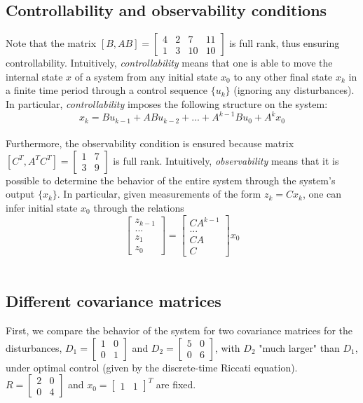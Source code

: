 \documentclass[11pt, oneside]{article}   	%
\begin{document}
\subsection{Controllability and observability conditions}
Note that the matrix $[B, AB] = \begin{bmatrix} 4 & 2 & 7 & 11 \\[0.3em] 1 & 3 & 10 & 10 \end{bmatrix}$ is full rank, thus ensuring controllability. Intuitively, \textit{controllability} means that one is able to move the internal state $x$ of a system from any initial state $x_0$ to any other final state $x_k$ in a finite time period through a control sequence $\{u_k\}$ (ignoring any disturbances). In particular, \textit{controllability} imposes the following structure on the system:
$$
x_k = B u_{k-1} + AB u_{k-2} + ... + A^{k-1}B u_{0} + A^k x_0
$$\\


Furthermore, the observability condition is ensured because matrix $[C^T, A^T C^T] = \begin{bmatrix} 1 & 7 \\[0.3em] 3 & 9 \end{bmatrix}$ is full rank. Intuitively, \textit{observability} means that it is possible to determine the behavior of the entire system through the system's output $\{x_k\}$. In particular, given measurements of the form $z_k = C x_k$, one can infer initial state $x_0$ through the relations
$$
\begin{bmatrix} z_{k-1} \\[0.3em] ... \\[0.3em] z_{1} \\[0.3em] z_{0}  \end{bmatrix} = 
\begin{bmatrix} CA^{k-1} \\[0.3em] ... \\[0.3em] CA \\[0.3em] C  \end{bmatrix} x_0
$$\\


\subsection{Different covariance matrices}
First, we compare the behavior of the system for two covariance matrices for the disturbances, $D_1 = \begin{bmatrix} 1 & 0 \\[0.3em] 0 & 1 \end{bmatrix}$ and $D_2 = \begin{bmatrix} 5 & 0 \\[0.3em] 0 & 6 \end{bmatrix}$, with $D_2$ "much larger" than $D_1$, under optimal control (given by the discrete-time Riccati equation). $R = \begin{bmatrix} 2 & 0 \\[0.3em] 0 & 4 \end{bmatrix}$ and $x_0 = \begin{bmatrix} 1 & 1 \end{bmatrix}^T$ are fixed. \\
\end{document}
